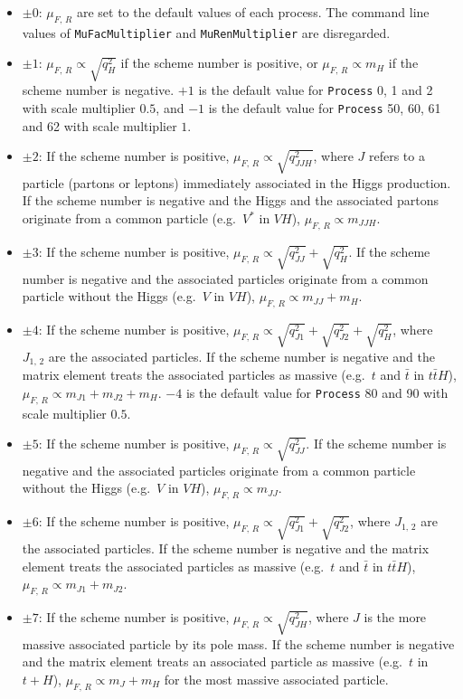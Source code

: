\documentclass[aps,superscriptaddress,nofootinbib]{revtex4}
\newcommand{\eg}{e.g.~}
\begin{document}
\begin{itemize}
     \begin{itemize}
     \item $\pm0$: $\mu_{F,\,R}$ are set to the default values of each process. The command line values of \verb|MuFacMultiplier| and \verb|MuRenMultiplier| are disregarded.
     \item $\pm1$: $\mu_{F,\,R} \propto \sqrt{q^2_H}$ if the scheme number is positive, or $\mu_{F,\,R} \propto m_H$ if the scheme number is negative. $+1$ is the default value for \verb|Process| 0, 1 and 2 with scale multiplier $0.5$, and  $-1$ is the default value for \verb|Process| 50, 60, 61 and 62 with scale multiplier $1$.
     \item $\pm2$: If the scheme number is positive, $\mu_{F,\,R} \propto \sqrt{q^2_{JJH}}$, where $J$ refers to a particle (partons or leptons) immediately associated in the Higgs production. If the scheme number is negative and the Higgs and the associated partons originate from a common particle (\eg $V^{*}$ in $VH$), $\mu_{F,\,R} \propto m_{JJH}$.
     \item $\pm3$: If the scheme number is positive, $\mu_{F,\,R} \propto \sqrt{q^2_{JJ}}+\sqrt{q^2_{H}}$. If the scheme number is negative and the associated particles originate from a common particle without the Higgs (\eg $V$ in $VH$), $\mu_{F,\,R} \propto m_{JJ}+m_{H}$.
     \item $\pm4$: If the scheme number is positive, $\mu_{F,\,R} \propto \sqrt{q^2_{J1}}+\sqrt{q^2_{J2}}+\sqrt{q^2_{H}}$, where $J_{1,\,2}$ are the associated particles. If the scheme number is negative and the matrix element treats the associated particles as massive (\eg $t$ and $\bar{t}$ in $t\bar{t}H$), $\mu_{F,\,R} \propto m_{J1}+m_{J2}+m_{H}$.  $-4$ is the default value for \verb|Process| 80 and 90 with scale multiplier $0.5$.
     \item $\pm5$: If the scheme number is positive, $\mu_{F,\,R} \propto \sqrt{q^2_{JJ}}$. If the scheme number is negative and the associated particles originate from a common particle without the Higgs (\eg $V$ in $VH$), $\mu_{F,\,R} \propto m_{JJ}$.
     \item $\pm6$: If the scheme number is positive, $\mu_{F,\,R} \propto \sqrt{q^2_{J1}}+\sqrt{q^2_{J2}}$, where $J_{1,\,2}$ are the associated particles. If the scheme number is negative and the matrix element treats the associated particles as massive (\eg $t$ and $\bar{t}$ in $t\bar{t}H$), $\mu_{F,\,R} \propto m_{J1}+m_{J2}$.
     \item $\pm7$: If the scheme number is positive, $\mu_{F,\,R} \propto \sqrt{q^2_{JH}}$, where $J$ is the more massive associated particle by its pole mass. If the scheme number is negative and the matrix element treats an associated particle as massive (\eg $t$ in $t+H$), $\mu_{F,\,R} \propto m_{J}+m_{H}$ for the most massive associated particle.

\end{itemize}
\end{itemize}
\end{document}
